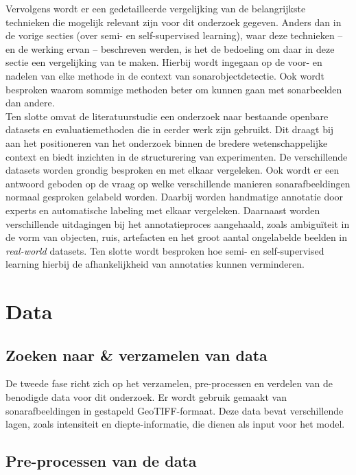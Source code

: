 Vervolgens wordt er een gedetailleerde vergelijking van de belangrijkste technieken die mogelijk relevant zijn voor dit onderzoek gegeven. Anders dan in de vorige secties (over semi- en self-supervised learning), waar deze technieken -- en de werking ervan -- beschreven werden, is het de bedoeling om daar in deze sectie een vergelijking van te maken. Hierbij wordt ingegaan op de voor- en nadelen van elke methode in de context van sonarobjectdetectie. Ook wordt besproken waarom sommige methoden beter om kunnen gaan met sonarbeelden dan andere. \\

Ten slotte omvat de literatuurstudie een onderzoek naar bestaande openbare datasets en evaluatiemethoden die in eerder werk zijn gebruikt. Dit draagt bij aan het positioneren van het onderzoek binnen de bredere wetenschappelijke context en biedt inzichten in de structurering van experimenten. De verschillende datasets worden grondig besproken en met elkaar vergeleken. Ook wordt er een antwoord geboden op de vraag op welke verschillende manieren sonarafbeeldingen normaal gesproken gelabeld worden. Daarbij worden handmatige annotatie door experts en automatische labeling met elkaar vergeleken. Daarnaast worden verschillende uitdagingen bij het annotatieproces aangehaald, zoals ambiguïteit in de vorm van objecten, ruis, artefacten en het groot aantal ongelabelde beelden in \emph{real-world} datasets. Ten slotte wordt besproken hoe semi- en self-supervised learning hierbij de afhankelijkheid van annotaties kunnen verminderen.

\section{Data}

\subsection{Zoeken naar \& verzamelen van data}

De tweede fase richt zich op het verzamelen, pre-processen en verdelen van de benodigde data voor dit onderzoek. Er wordt gebruik gemaakt van sonarafbeeldingen in gestapeld GeoTIFF-formaat. Deze data bevat verschillende lagen, zoals intensiteit en diepte-informatie, die dienen als input voor het model.

\subsection{Pre-processen van de data}

